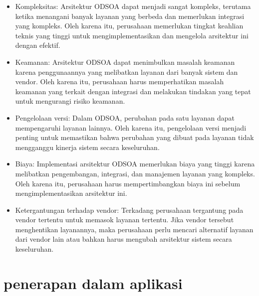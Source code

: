 \documentclass{article}
\begin{document}
	\begin{itemize}
		\item Kompleksitas: Arsitektur ODSOA dapat menjadi sangat kompleks, terutama ketika menangani banyak layanan yang berbeda dan memerlukan integrasi yang kompleks. Oleh karena itu, perusahaan memerlukan tingkat keahlian teknis yang tinggi untuk 					mengimplementasikan dan mengelola arsitektur ini dengan efektif.
		\item Keamanan: Arsitektur ODSOA dapat menimbulkan masalah keamanan karena penggunaannya yang melibatkan layanan dari banyak sistem dan vendor. Oleh karena itu, perusahaan harus memperhatikan masalah keamanan yang terkait dengan integrasi dan 				melakukan tindakan yang tepat untuk mengurangi risiko keamanan.
		\item Pengelolaan versi: Dalam ODSOA, perubahan pada satu layanan dapat mempengaruhi layanan lainnya. Oleh karena itu, pengelolaan versi menjadi penting untuk memastikan bahwa perubahan yang dibuat pada layanan tidak mengganggu kinerja sistem secara 			keseluruhan.
		\item Biaya: Implementasi arsitektur ODSOA memerlukan biaya yang tinggi karena melibatkan pengembangan, integrasi, dan manajemen layanan yang kompleks. Oleh karena itu, perusahaan harus mempertimbangkan biaya ini sebelum mengimplementasikan 					arsitektur ini.
		\item Ketergantungan terhadap vendor: Terkadang perusahaan tergantung pada vendor tertentu untuk memasok layanan tertentu. Jika vendor tersebut menghentikan layanannya, maka perusahaan perlu mencari alternatif layanan dari vendor lain atau bahkan 				harus mengubah arsitektur sistem secara keseluruhan.
	\end{itemize}

	\section{penerapan dalam aplikasi}
\end{document}
